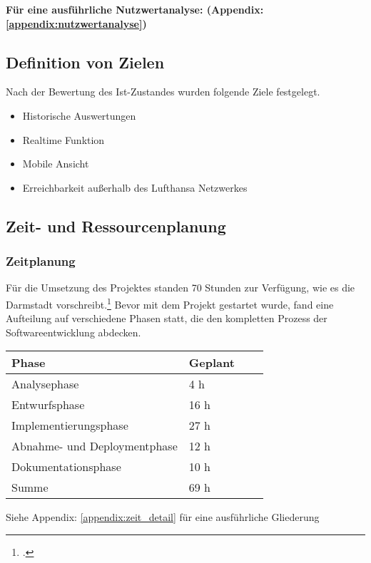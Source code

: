 		\textbf{Für eine ausführliche Nutzwertanalyse: (Appendix: \ref{appendix:nutzwertanalyse})}

	\subsection{Definition von Zielen}
	Nach der Bewertung des Ist-Zustandes wurden folgende Ziele festgelegt.
	\begin{itemize}
		\item Historische Auswertungen
		\item Realtime Funktion
		\item Mobile Ansicht
		\item Erreichbarkeit außerhalb des Lufthansa Netzwerkes
	\end{itemize}


	\subsection{Zeit- und Ressourcenplanung}

	\subsubsection{Zeitplanung}
	Für die Umsetzung des Projektes standen 70 Stunden zur Verfügung, wie es die  Darmstadt vorschreibt.\footcite{2} Bevor mit dem Projekt gestartet wurde, fand eine Aufteilung auf verschiedene Phasen statt,
	die den kompletten Prozess der Softwareentwicklung abdecken.\\

	\begin{table}[htp]

		\begin{center}
			\begin{tabular}{llll} \toprule
				Phase & Geplant\\ \bottomrule
				Analysephase & 4 h \\
				Entwurfsphase & 16 h \\
				Implementierungsphase & 27 h \\
				Abnahme- und Deploymentphase & 12 h \\
				Dokumentationsphase & 10 h \\ \bottomrule
				Summe & 69 h \\
			\end{tabular}
		\end{center}
	Siehe Appendix: \ref{appendix:zeit_detail} für eine ausführliche Gliederung
	\end{table}


